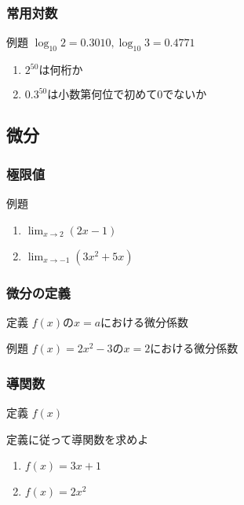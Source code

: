 \documentclass[10pt,dvipdfmx]{jsarticle}
\begin{document}
\subsubsection*{常用対数}
\begin{itembox}[l]{例題}
  $\log_{10}2=0.3010, \log_{10}3=0.4771$
  \begin{large}
    \begin{enumerate}
      \item $2^{50}は何桁か$
      \item $0.3^{50}は小数第何位で初めて0でないか$
    \end{enumerate}
  \end{large}
\end{itembox}

\newpage
\subsection*{微分}
\subsubsection*{極限値}
\begin{itembox}[l]{例題}
  \begin{large}
    \begin{multicols}{2}
      \begin{enumerate}
        \item $\lim_{x\rightarrow2}(2x-1)$
        \item $\lim_{x\rightarrow-1}(3x^2+5x)$
      \end{enumerate}
    \end{multicols}
  \end{large}
\end{itembox}


\subsubsection*{微分の定義}
定義 $f(x)のx=aにおける微分係数$
\vspace{8mm}
\begin{itembox}[l]{例題}
  $f(x)=2x^2-3$の$x=2$における微分係数
\end{itembox}

\subsubsection*{導関数}
定義 $f(x)$
\vspace{8mm}
\begin{itembox}[l]{定義に従って導関数を求めよ}
  \begin{multicols}{2}
    \begin{large}
      \begin{enumerate}
        \item $f(x)=3x+1$
        \item $f(x)=2x^2$
      \end{enumerate}
    \end{large}
  \end{multicols}
\end{itembox}
\end{document}
